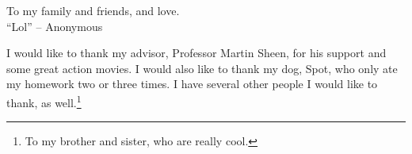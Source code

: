 \begin{dedication}
  To my family and friends,
  and love. \\[3ex]
  ``Lol''
  -- Anonymous
\end{dedication}

\begin{acknowledgments}
  \vspace{1.1in}
  I would like to thank my advisor, Professor Martin Sheen, for his support
  and some great action movies.  I would also like to thank my dog, Spot,
  who only ate my homework two or three times.  I have several other people
  I would like to thank, as well.\footnote{To my brother and sister, who
    are really cool.}
\end{acknowledgments}


